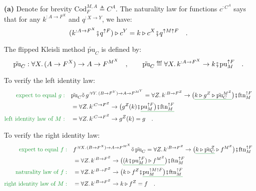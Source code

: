 \textbf{(a)} Denote for brevity $\text{Cod}_{F}^{M,A}\triangleq C^{A}$.
The naturality law for functions $c^{:C^{A}}$ says that for any $k^{:A\rightarrow F^{X}}$
and $q^{:X\rightarrow Y}$, we have:
\[
(k^{:A\rightarrow F^{X}}\bef q^{\uparrow F})\triangleright c^{Y}=k\triangleright c^{X}\bef q^{\uparrow M\uparrow F}\quad.
\]

The flipped Kleisli method $\tilde{\text{pu}}_{C}$ is defined by:
\[
\tilde{\text{pu}}_{C}:\forall X.\,(A\rightarrow F^{X})\rightarrow A\rightarrow F^{M^{X}}\quad,\quad\quad\tilde{\text{pu}}_{C}\triangleq\forall X.\,k^{:A\rightarrow F^{X}}\rightarrow k\bef\text{pu}_{M}^{\uparrow F}\quad.
\]

To verify the left identity law:
\begin{align*}
{\color{greenunder}\text{expect to equal }g:}\quad & \tilde{\text{pu}}_{C}\tilde{\diamond}\,g^{:\forall Y.\,(B\rightarrow F^{Y})\rightarrow A\rightarrow F^{M^{Y}}}=\forall Z.\,k^{:B\rightarrow F^{Z}}\rightarrow\big(\gunderline{k\triangleright g^{Z}\triangleright\tilde{\text{pu}}_{C}^{M^{Z}}}\big)\bef\text{ftn}_{M}^{\uparrow F}\\
 & =\forall Z.\,k^{:C\rightarrow F^{Z}}\rightarrow\big(g^{Z}(k)\bef\gunderline{\text{pu}_{M}^{\uparrow F}\big)\bef\text{ftn}_{M}^{\uparrow F}}\\
{\color{greenunder}\text{left identity law of }M:}\quad & =\forall Z.\,k^{:C\rightarrow F^{Z}}\rightarrow g^{Z}(k)=g\quad.
\end{align*}

To verify the right identity law:
\begin{align*}
{\color{greenunder}\text{expect to equal }f:}\quad & f^{:\forall X.\,(B\rightarrow F^{X})\rightarrow A\rightarrow F^{M^{X}}}\tilde{\diamond}\,\tilde{\text{pu}}_{C}=\forall Z.\,k^{:B\rightarrow F^{Z}}\rightarrow\big(\gunderline{k\triangleright\tilde{\text{pu}}_{C}^{Z}}\triangleright f^{M^{Z}}\big)\bef\text{ftn}_{M}^{\uparrow F}\\
 & =\forall Z.\,k^{:B\rightarrow F^{Z}}\rightarrow\big(\gunderline{(k\bef\text{pu}_{M}^{\uparrow F})\triangleright f^{M^{Z}}}\big)\bef\text{ftn}_{M}^{\uparrow F}\\
{\color{greenunder}\text{naturality law of }f:}\quad & =\forall Z.\,k^{:B\rightarrow F^{Z}}\rightarrow\big(k\triangleright f^{Z}\bef\gunderline{\text{pu}_{M}^{\uparrow M\uparrow F}\big)\bef\text{ftn}_{M}^{\uparrow F}}\\
{\color{greenunder}\text{right identity law of }M:}\quad & =\forall Z.\,k^{:B\rightarrow F^{Z}}\rightarrow k\triangleright f^{Z}=f\quad.
\end{align*}

